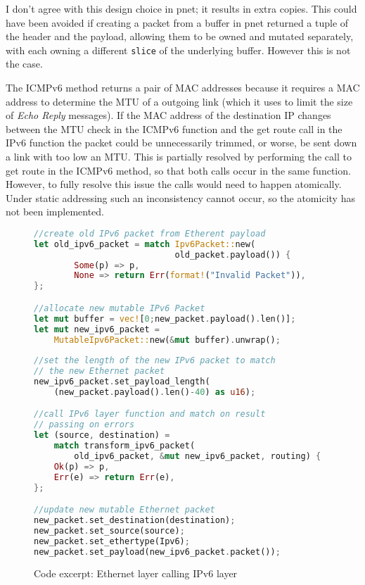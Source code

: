\documentclass[12pt,a4paper,twoside,openany]{report}
\begin{document}
I don't agree with this design choice in pnet; it results in extra copies. This could have been avoided if creating a packet from a buffer in pnet returned a tuple of the header and the payload, allowing them to be owned and mutated separately, with each owning a different \verb!slice! of the underlying buffer.  However this is not the case. 

The ICMPv6 method returns a pair of MAC addresses because it requires a MAC address to determine the MTU of a outgoing link (which it uses to limit the size of \textit{Echo Reply} messages).  If the MAC address of the destination IP changes between the MTU check in the ICMPv6 function and the get route call in the IPv6 function the packet could be unnecessarily trimmed, or worse, be sent down a link with too low an MTU. This is partially resolved by performing the call to get route in the ICMPv6 method, so that both calls occur in the same function. However, to fully resolve this issue the calls would need to happen atomically. Under static addressing such an inconsistency cannot occur, so the atomicity has not been implemented.

\begin{figure}
\centering
\begin{varwidth}{\linewidth}
\begin{lstlisting}[language=Rust]
//create old IPv6 packet from Etherent payload
let old_ipv6_packet = match Ipv6Packet::new(
                            old_packet.payload()) {
        Some(p) => p,
        None => return Err(format!("Invalid Packet")),
};

//allocate new mutable IPv6 Packet
let mut buffer = vec![0;new_packet.payload().len()];
let mut new_ipv6_packet = 
    MutableIpv6Packet::new(&mut buffer).unwrap();
    
//set the length of the new IPv6 packet to match
// the new Ethernet packet
new_ipv6_packet.set_payload_length(
    (new_packet.payload().len()-40) as u16);

//call IPv6 layer function and match on result
// passing on errors
let (source, destination) = 
    match transform_ipv6_packet(
        old_ipv6_packet, &mut new_ipv6_packet, routing) {
    Ok(p) => p,
    Err(e) => return Err(e),
};

//update new mutable Ethernet packet
new_packet.set_destination(destination);
new_packet.set_source(source);
new_packet.set_ethertype(Ipv6);
new_packet.set_payload(new_ipv6_packet.packet());
\end{lstlisting}
\end{varwidth}
\caption{Code excerpt: Ethernet layer calling IPv6 layer}
\label{fig::mutability}
\end{figure}
\end{document}
